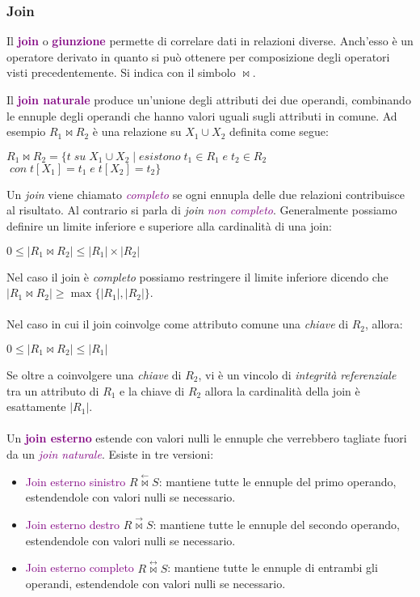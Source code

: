 \subsubsection{Join}
Il \textbf{\textcolor{purple}{join}} o \textbf{\textcolor{purple}{giunzione}} permette di
correlare dati in relazioni diverse. Anch'esso è un operatore derivato in quanto si può ottenere per composizione
degli operatori visti precedentemente. Si indica con il simbolo $\bowtie$.

Il \textbf{\textcolor{purple}{join naturale}} produce un'unione degli attributi dei due operandi, combinando le ennuple
degli operandi che hanno valori uguali sugli attributi in comune. Ad esempio $R_1 \bowtie R_2$ è una relazione su $X_1 \cup X_2$ definita come segue:
\begin{center}
    $R_1 \bowtie R_2 = \{t \;su\; X_1 \cup X_2 \;|\; esistono \;t_1 \in R_1 \;e\; t_2 \in R_2 $ \\
    $\;con\; t[X_1] = t_1 \;e\; t[X_2] = t_2\}$
\end{center}

Un \emph{join} viene chiamato \emph{\textcolor{purple}{completo}} se ogni ennupla delle due relazioni
contribuisce al risultato. Al contrario si parla di \emph{join} \emph{\textcolor{purple}{non completo}}.
Generalmente possiamo definire un limite inferiore e superiore alla cardinalità di una join:
\begin{center}
    $0 \leq |R_1 \bowtie R_2| \leq |R_1| \times |R_2|$
\end{center}
Nel caso il join è \emph{completo} possiamo restringere il limite inferiore
dicendo che $|R_1 \bowtie R_2| \geq \max\{|R_1|, |R_2|\}$.
\\\\
Nel caso in cui il join coinvolge come attributo comune una \emph{chiave} di $R_2$, allora:
\begin{center}
    $0 \leq |R_1 \bowtie R_2| \leq |R_1|$
\end{center}

Se oltre a coinvolgere una \emph{chiave} di $R_2$, vi è un vincolo di \emph{integrità referenziale} tra un
attributo di $R_1$ e la chiave di $R_2$ allora la cardinalità della join è esattamente $|R_1|$.
\\\\
Un \textbf{\textcolor{purple}{join esterno}} estende con valori nulli le ennuple che verrebbero
tagliate fuori da un \emph{\textcolor{purple}{join naturale}}.
Esiste in tre versioni:
\begin{itemize}
    \item \textcolor{purple}{Join esterno sinistro} $R \overset{\leftarrow}{\bowtie} S$: mantiene tutte le ennuple del primo
        operando, estendendole con valori nulli se necessario.
    \item \textcolor{purple}{Join esterno destro} $R \overset{\rightarrow}{\bowtie} S$: mantiene tutte le ennuple del secondo
    operando, estendendole con valori nulli se necessario.
    \item \textcolor{purple}{Join esterno completo} $R \overset{\leftrightarrow}{\bowtie} S$: mantiene tutte le ennuple di entrambi
        gli operandi, estendendole con valori nulli se necessario.
\end{itemize}

